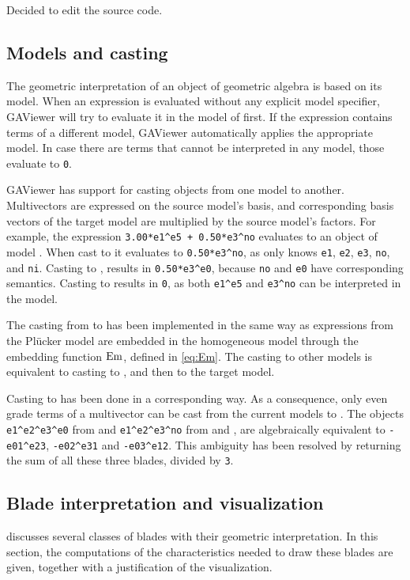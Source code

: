 Decided to edit the source code.

\subsection{Models and casting}
The geometric interpretation of an object of geometric algebra is based on its model.  When an expression is evaluated without any explicit model specifier, GAViewer will try to evaluate it in the model of \ega{} first.  If the expression contains terms of a different model, GAViewer automatically applies the appropriate model.  In case there are terms that cannot be interpreted in any model, those evaluate to \texttt{0}.

GAViewer has support for casting objects from one model to another.  Multivectors are expressed on the source model's basis, and corresponding basis vectors of the target model are multiplied by the source model's factors.  For example, the expression \texttt{3.00*e1\^{}e5 + 0.50*e3\^{}no} evaluates to an object of model \cbga{}.  When cast to \cga{} it evaluates to \texttt{0.50*e3\^{}no}, as \cga{} only knows \texttt{e1}, \texttt{e2}, \texttt{e3}, \texttt{no}, and \texttt{ni}.  Casting to \pga{}, results in \texttt{0.50*e3\^{}e0}, because \texttt{no} and \texttt{e0} have corresponding semantics.  Casting to \ega{} results in \texttt{0}, as both \texttt{e1\^{}e5} and \texttt{e3\^{}no} can be interpreted in the model.

The casting from \lga{} to \pga{} has been implemented in the same way as expressions from the Pl\"ucker model are embedded in the homogeneous model through the embedding function $\operatorname{Em}$, defined in \autoref{eq:Em}.  The casting to other models is equivalent to casting to \pga{}, and then to the target model.

Casting to \lga{} has been done in a corresponding way.  As a consequence, only even grade terms of a multivector can be cast from the current models to \lga{}.  The objects \texttt{e1\^{}e2\^{}e3\^{}e0} from \pga{} and \texttt{e1\^{}e2\^{}e3\^{}no} from \cga{} and \cbga{}, are algebraically equivalent to \texttt{-e01\^{}e23}, \texttt{-e02\^{}e31} and \texttt{-e03\^{}e12}.  This ambiguity has been resolved by returning the sum of all these three blades, divided by \texttt{3}.

\subsection{Blade interpretation and visualization}
 discusses several classes of blades with their geometric interpretation.  In this section, the computations of the characteristics needed to draw these blades are given, together with a justification of the visualization.

